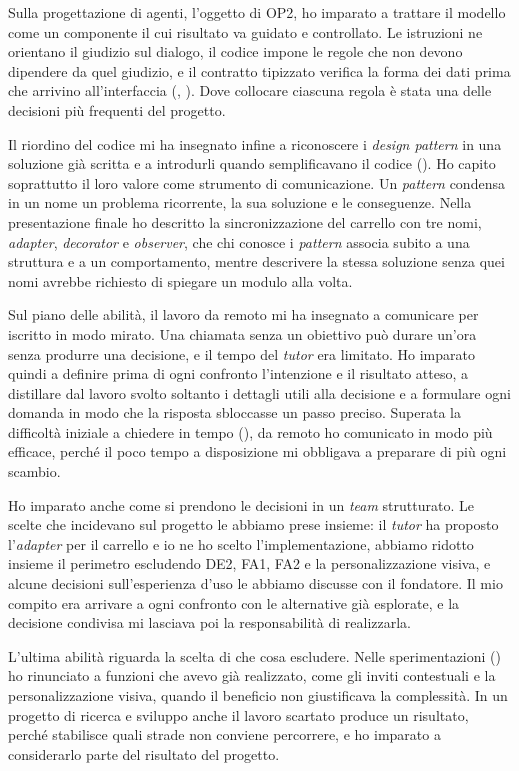 Sulla progettazione di agenti, l’oggetto di OP2, ho imparato a trattare il modello come un
componente il cui risultato va guidato e controllato. Le istruzioni ne orientano il giudizio sul
dialogo, il codice impone le regole che non devono dipendere da quel giudizio, e il contratto
tipizzato verifica la forma dei dati prima che arrivino all’interfaccia (,
). Dove collocare ciascuna regola è stata una delle decisioni più frequenti del
progetto.

Il riordino del codice mi ha insegnato infine a riconoscere i \emph{design pattern} in una soluzione
già scritta e a introdurli quando semplificavano il codice (). Ho capito
soprattutto il loro valore come strumento di comunicazione. Un \emph{pattern} condensa in un nome un
problema ricorrente, la sua soluzione e le conseguenze. Nella presentazione finale ho descritto la
sincronizzazione del carrello con tre nomi, \emph{adapter}, \emph{decorator} e \emph{observer}, che
chi conosce i \emph{pattern} associa subito a una struttura e a un comportamento, mentre descrivere
la stessa soluzione senza quei nomi avrebbe richiesto di spiegare un modulo alla volta.

Sul piano delle abilità, il lavoro da remoto mi ha insegnato a comunicare per iscritto in modo
mirato. Una chiamata senza un obiettivo può durare un’ora senza produrre una decisione, e il tempo
del \emph{tutor} era limitato. Ho imparato quindi a definire prima di ogni confronto l’intenzione e
il risultato atteso, a distillare dal lavoro svolto soltanto i dettagli utili alla decisione e a
formulare ogni domanda in modo che la risposta sbloccasse un passo preciso. Superata la difficoltà
iniziale a chiedere in tempo (), da remoto ho comunicato in modo più
efficace, perché il poco tempo a disposizione mi obbligava a preparare di più ogni scambio.

Ho imparato anche come si prendono le decisioni in un \emph{team} strutturato. Le scelte che
incidevano sul progetto le abbiamo prese insieme: il \emph{tutor} ha proposto l’\emph{adapter} per
il carrello e io ne ho scelto l’implementazione, abbiamo ridotto insieme il perimetro escludendo
DE2, FA1, FA2 e la personalizzazione visiva, e alcune decisioni sull’esperienza d’uso le abbiamo
discusse con il fondatore. Il mio compito era arrivare a ogni confronto con le alternative già
esplorate, e la decisione condivisa mi lasciava poi la responsabilità di realizzarla.

L’ultima abilità riguarda la scelta di che cosa escludere. Nelle sperimentazioni
() ho rinunciato a funzioni che avevo già realizzato, come gli inviti
contestuali e la personalizzazione visiva, quando il beneficio non giustificava la complessità. In
un progetto di ricerca e sviluppo anche il lavoro scartato produce un risultato, perché stabilisce
quali strade non conviene percorrere, e ho imparato a considerarlo parte del risultato del progetto.

